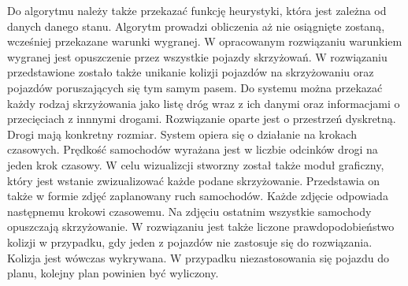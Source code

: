 Do algorytmu należy także przekazać funkcję heurystyki, która jest zależna od danych danego stanu.
\newline
\newline
Algorytm prowadzi obliczenia aż nie osiągnięte zostaną, wcześniej przekazane warunki wygranej.
\newline
\newline
W opracowanym rozwiązaniu warunkiem wygranej jest opuszczenie przez wszystkie pojazdy skrzyżowań.
\newline
\newline
W rozwiązaniu przedstawione zostało także unikanie kolizji pojazdów na skrzyżowaniu oraz pojazdów poruszających się tym samym pasem.
\newline
\newline
Do systemu można przekazać każdy rodzaj skrzyżowania jako listę dróg wraz z ich danymi oraz informacjami o przecięciach z innnymi drogami.
\newline
\newline
Rozwiązanie oparte jest o przestrzeń dyskretną. Drogi mają konkretny rozmiar. System opiera się o działanie na krokach czasowych. Prędkość samochodów wyrażana jest w liczbie odcinków drogi na jeden krok czasowy.
\newline
\newline
W celu wizualizcji stworzny został także moduł graficzny, który jest wstanie zwizualizować każde podane skrzyżowanie. Przedstawia on także w formie zdjęć zaplanowany ruch samochodów. Każde zdjęcie odpowiada następnemu krokowi czasowemu. Na zdjęciu ostatnim wszystkie samochody opuszczają skrzyżowanie.
\newline
\newline
W rozwiązaniu jest także liczone prawdopodobieństwo kolizji w przypadku, gdy jeden z pojazdów nie zastosuje się do rozwiązania. Kolizja jest wówczas wykrywana. W przypadku niezastosowania się pojazdu do planu, kolejny plan powinien być wyliczony.
